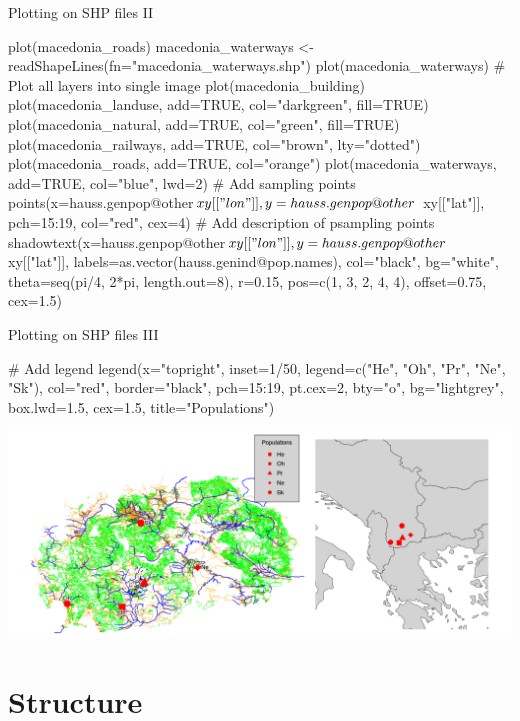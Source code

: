 \documentclass[compress, ucs, xelatex, 11pt, xcolor=svgnames,
  hyperref={
    bookmarks=true,
    unicode=true,
    colorlinks=true,
    pdftitle={Molecular data in R},
    plainpages=false,
    pdfauthor={Vojtech Zeisek},
    pdfsubject={Course about phylogeny and evolution in R},
    pdfcreator={XeLaTeX},
    pdfkeywords={R, evolution, phylogeny, molecular data},
    linkcolor=Tomato,
    anchorcolor=SaddleBrown,
    citecolor=Goldenrod,
    filecolor=DarkMagenta,
    menucolor=Sienna,
    urlcolor=DarkTurquoise,
    pdftex},
  url={hyphens, lowtilde} %
  ]{beamer}
\begin{document}
\begin{frame}[fragile]{Plotting on SHP files II}
  \begin{spluscode}
    plot(macedonia_roads)
    macedonia_waterways <- readShapeLines(fn="macedonia_waterways.shp")
    plot(macedonia_waterways)
    # Plot all layers into single image
    plot(macedonia_building)
    plot(macedonia_landuse, add=TRUE, col="darkgreen", fill=TRUE)
    plot(macedonia_natural, add=TRUE, col="green", fill=TRUE)
    plot(macedonia_railways, add=TRUE, col="brown", lty="dotted")
    plot(macedonia_roads, add=TRUE, col="orange")
    plot(macedonia_waterways, add=TRUE, col="blue", lwd=2)
    # Add sampling points
    points(x=hauss.genpop@other$xy[["lon"]], y=hauss.genpop@other$
      xy[["lat"]], pch=15:19, col="red", cex=4)
    # Add description of psampling points
    shadowtext(x=hauss.genpop@other$xy[["lon"]], y=hauss.genpop@other$
      xy[["lat"]], labels=as.vector(hauss.genind@pop.names), col="black",
      bg="white", theta=seq(pi/4, 2*pi, length.out=8), r=0.15,
      pos=c(1, 3, 2, 4, 4), offset=0.75, cex=1.5)
  \end{spluscode}
\end{frame}

\begin{frame}[fragile]{Plotting on SHP files III}
  \begin{spluscode}
    # Add legend
    legend(x="topright", inset=1/50, legend=c("He", "Oh", "Pr", "Ne",
      "Sk"), col="red", border="black", pch=15:19, pt.cex=2, bty="o",
      bg="lightgrey", box.lwd=1.5, cex=1.5, title="Populations")
  \end{spluscode}
\includegraphics[width=\textwidth]{mapy.png}
\end{frame}

\section{Structure}
\end{document}
